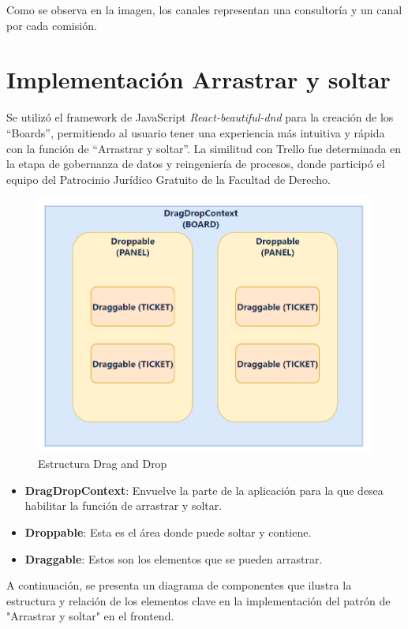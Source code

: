 Como se observa en la imagen, los canales representan una consultoría y un canal por cada comisión.


\section{Implementación Arrastrar y soltar}
Se utilizó el framework de JavaScript \textit{React-beautiful-dnd} para la creación de los ``Boards'', permitiendo al usuario tener una experiencia más intuitiva y rápida con la función de ``Arrastrar y soltar''. La similitud con Trello fue determinada en la etapa de gobernanza de datos y reingeniería de procesos, donde participó el equipo del Patrocinio Jurídico Gratuito de la Facultad de Derecho.

\begin{figure}[H] \centering \includegraphics[width=1\linewidth]{fig/drag-drop.png} \caption{Estructura Drag and Drop} \label{fig:enter-label} \end{figure}

\begin{itemize}
    \item \textbf{DragDropContext}: Envuelve la parte de la aplicación para la que desea habilitar la función de arrastrar y soltar.
    \item \textbf{Droppable}: Esta es el área donde puede soltar y contiene.
    \item \textbf{Draggable}: Estos son los elementos que se pueden arrastrar.
\end{itemize}

A continuación, se presenta un diagrama de componentes que ilustra la estructura y relación de los elementos clave en la implementación del patrón de "Arrastrar y soltar" en el frontend.

